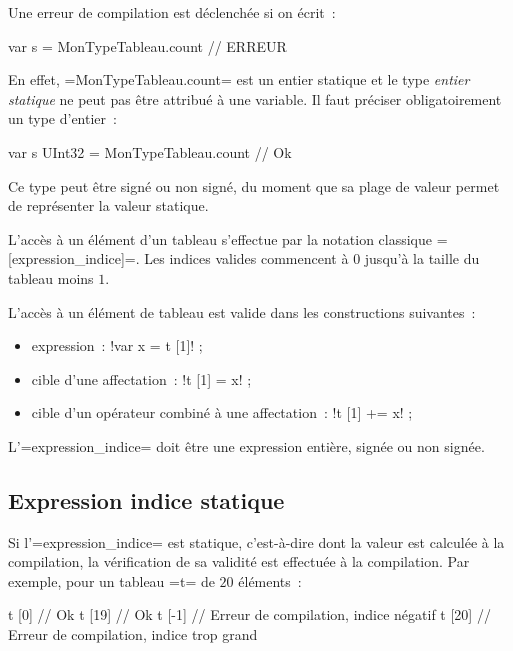 Une erreur de compilation est déclenchée si on écrit~:
\begin{OMNIBUS}
var s = MonTypeTableau.count // ERREUR
\end{OMNIBUS}

En effet, \omnibus=MonTypeTableau.count= est un entier statique et le type \emph{entier statique} ne peut pas être attribué à une variable. Il faut préciser obligatoirement un type d'entier~:

\begin{OMNIBUS}
var s UInt32 = MonTypeTableau.count // Ok
\end{OMNIBUS}

Ce type peut être signé ou non signé, du moment que sa plage de valeur permet de représenter la valeur statique.







L'accès à un élément d'un tableau s'effectue par la notation classique \omnibus=[expression_indice]=. Les indices valides commencent à $0$ jusqu'à la taille du tableau moins $1$.

L'accès à un élément de tableau est valide dans les constructions suivantes~:
\begin{itemize}
  \item expression~: \omnibus!var x = t [1]! ;
  \item cible d'une affectation~: \omnibus!t [1] = x! ;
  \item cible d'un opérateur combiné à une affectation~: \omnibus!t [1] += x! ;
\end{itemize}

L'\omnibus=expression_indice= doit être une expression entière, signée ou non signée.

\subsection{Expression indice statique}

Si l'\omnibus=expression_indice= est statique, c'est-à-dire dont la valeur est calculée à la compilation, la vérification de sa validité est effectuée à la compilation. Par exemple, pour un tableau \omnibus=t= de $20$ éléments~:
\begin{OMNIBUS}
t [0] // Ok
t [19] // Ok
t [-1] // Erreur de compilation, indice négatif
t [20] // Erreur de compilation, indice trop grand
\end{OMNIBUS}

